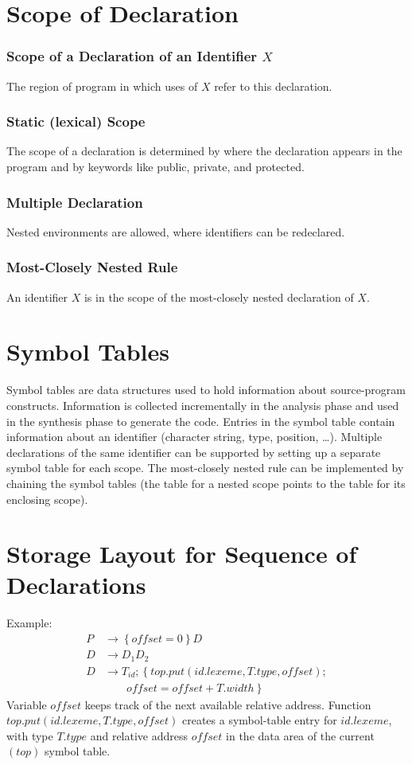 \section{Scope of Declaration}
\subsubsection{Scope of a Declaration of an Identifier $X$}
The region of program in which uses of $X$ refer to this declaration.
\subsubsection{Static (lexical) Scope}
The scope of a declaration is determined by where the declaration appears in the program and by keywords like public, private, and protected.
\subsubsection{Multiple Declaration}
Nested environments are allowed, where identifiers can be redeclared.
\subsubsection{Most-Closely Nested Rule}
An identifier $X$ is in the scope of the most-closely nested declaration of $X$.

\section{Symbol Tables}
Symbol tables are data structures used to hold information about source-program constructs.
Information is collected incrementally in the analysis phase and used in the synthesis phase to generate the code.
Entries in the symbol table contain information about an identifier (character string, type, position, \ldots).
Multiple declarations of the same identifier can be supported by setting up a separate symbol table for each scope.
The most-closely nested rule can be implemented by chaining the symbol tables (the table for a nested scope points to the table for its enclosing scope).

\section{Storage Layout for Sequence of Declarations}
Example:
\begin{align*}
    P &\to \left\{offset = 0\right\}D \\
    D &\to D_1D_2 \\
    D &\to T_{id}; \left\{top.put(id.lexeme, T.type, offset); \right. \\
        &\qquad \left. offset = offset + T.width\right\}
\end{align*}
Variable $offset$ keeps track of the next available relative address.
Function $top.put(id.lexeme, T.type, offset)$ creates a symbol-table entry for $id.lexeme$, with type $T.type$ and relative address $offset$ in the data area of the current $(top)$ symbol table.

